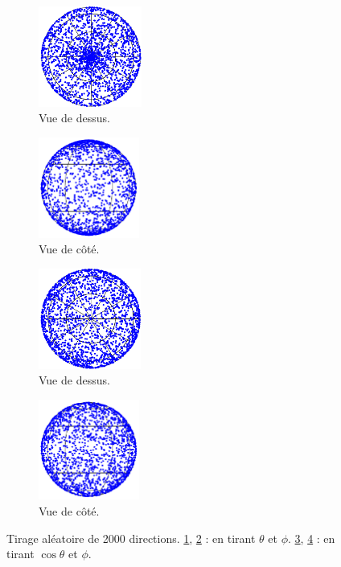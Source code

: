 \documentclass[11pt]{article}
\numberwithin{equation}{section}
\begin{document}
\begin{figure}[h!]
\center
    \begin{subfigure}[b]{0.22\textwidth}
    	\center
    	\includegraphics[height=3.3cm]{figures/dessus1.pdf}
    	\caption{Vue de dessus.}
    	\label{a}
    \end{subfigure}	
	\begin{subfigure}[b]{0.22\textwidth}
    	\center
    	\includegraphics[height=3.3cm]{figures/side1.pdf}
    	\caption{Vue de côté.}
    	\label{b}
    \end{subfigure}
		\begin{subfigure}[b]{0.02\textwidth}
		\hspace{0.05cm}
    	\center
    \end{subfigure}
    \begin{subfigure}[b]{0.22\textwidth}
    	\center
    	\includegraphics[height=3.3cm]{figures/dessus2.pdf}
    	\caption{Vue de dessus.}
    	\label{c}
    \end{subfigure}	
    \begin{subfigure}[b]{0.22\textwidth}
    	\center
    	\includegraphics[height=3.3cm]{figures/side2.pdf}
    	\caption{Vue de côté.}
    	\label{d}
    \end{subfigure}	
    \caption{Tirage aléatoire de 2000 directions. \ref{a}, \ref{b} : en tirant  $\theta$ et $\phi$. \ref{c}, \ref{d} : en tirant  $\cos \theta$ et $\phi$.}
    \label{equipartition}
\end{figure}
\vspace{-0.6cm}
\end{document}
